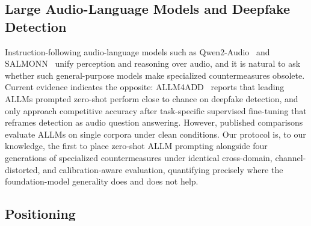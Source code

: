 \subsection{Large Audio-Language Models and Deepfake Detection}
\label{ssec:related-allm}

Instruction-following audio-language models such as Qwen2-Audio~\cite{chu2024qwen2audio}
and SALMONN~\cite{tang2024salmonn} unify perception and reasoning over audio, and it
is natural to ask whether such general-purpose models make specialized countermeasures
obsolete. Current evidence indicates the opposite: ALLM4ADD~\cite{gong2025allm4add}
reports that leading ALLMs prompted zero-shot perform close to chance on deepfake
detection, and only approach competitive accuracy after task-specific supervised
fine-tuning that reframes detection as audio question answering. However, published
comparisons evaluate ALLMs on single corpora under clean conditions. Our protocol is,
to our knowledge, the first to place zero-shot ALLM prompting alongside four
generations of specialized countermeasures under identical cross-domain,
channel-distorted, and calibration-aware evaluation, quantifying precisely where the
foundation-model generality does and does not help.

\subsection{Positioning}
\label{ssec:related-positioning}

